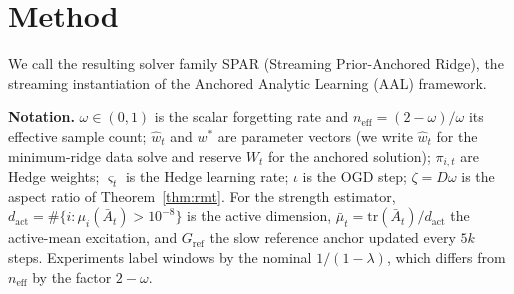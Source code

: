 \documentclass[10pt]{article}
\begin{document}
\begin{table}[t]
\centering
\footnotesize
\setlength{\tabcolsep}{4pt}
\caption{What is new relative to the nearest lines of work. ``DE'' is the finite-window deterministic-equivalent correction; ``Lean'' the machine-checked core.}
\label{tab:related}
\end{table}

\section{Method}
We call the resulting solver family SPAR (Streaming Prior-Anchored Ridge), the streaming instantiation of the Anchored Analytic Learning (AAL) framework.

\textbf{Notation.}
$\omega \in (0,1)$ is the scalar forgetting rate and $n_{\mathrm{eff}} = (2-\omega)/\omega$ its effective sample count; $\widehat w_t$ and $w^*$ are parameter vectors (we write $\widehat w_t$ for the minimum-ridge data solve and reserve $W_t$ for the anchored solution); $\pi_{i,t}$ are Hedge weights; $\varsigma_t$ is the Hedge learning rate; $\iota$ is the OGD step; $\zeta = D\omega$ is the aspect ratio of Theorem~\ref{thm:rmt}. For the strength estimator, $d_{\mathrm{act}} = \#\{i:\mu_i(\bar A_t) > 10^{-8}\}$ is the active dimension, $\bar\mu_t = \mathrm{tr}(\bar A_t)/d_{\mathrm{act}}$ the active-mean excitation, and $G_{\mathrm{ref}}$ the slow reference anchor updated every $5k$ steps. Experiments label windows by the nominal $1/(1-\lambda)$, which differs from $n_{\mathrm{eff}}$ by the factor $2-\omega$.
\end{document}
